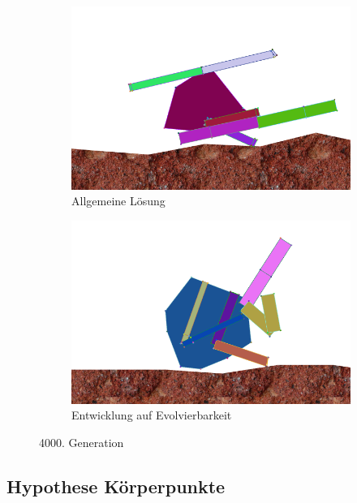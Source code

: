       \begin{figure}[H]
        \centering
        \begin{subfigure}[b]{0.45\textwidth}
          \includegraphics[width=\linewidth,center]{graphics/simulation-discussion/4_gen4000}
          \caption{Allgemeine Lösung\label{fig:gen4000_alg}}
        \end{subfigure}
        \begin{subfigure}[b]{0.45\textwidth}
          \includegraphics[width=\linewidth,center]{graphics/simulation-discussion/5_gen4000}
          \caption{Entwicklung auf Evolvierbarkeit\label{fig:gen4000_ev}}
        \end{subfigure}

        \caption{4000. Generation\label{fig:gen4000}}
      \end{figure}


    \subsection{Hypothese Körperpunkte\label{sub:PerspectiveHypBodyPoints}}

